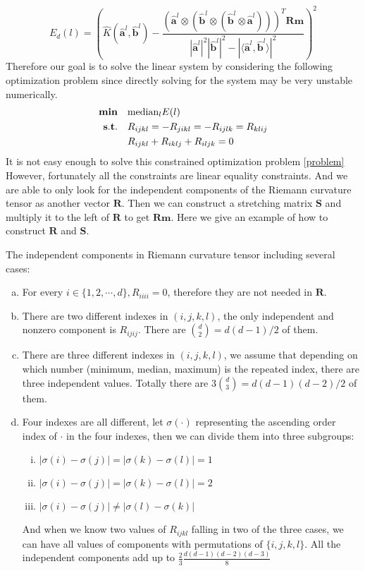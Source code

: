 \documentclass{article}
\begin{document}
\begin{equation}
	E_d(l)= \left(\widehat{K}(\widehat{\boldsymbol{a}}^l,\widehat{\boldsymbol{b}}^l)-\frac{(\widehat{\boldsymbol{a}}^l\otimes(\widehat{\boldsymbol{b}}^l\otimes(\widehat{\boldsymbol{b}}^l\otimes\widehat{\boldsymbol{a}}^l)))^T\boldsymbol{Rm}}{|\widehat{\boldsymbol{a}}^l|^2|\widehat{\boldsymbol{b}}^l|^2-|\langle \widehat{\boldsymbol{a}}^l,\widehat{\boldsymbol{b}}^l\rangle|^2}\right)^2
	\label{loss}
\end{equation}
Therefore our goal is to solve the linear system by considering the following optimization problem since directly solving for the system may be very unstable numerically.
\begin{align}
\notag
\textbf{min}\quad &\text{median}_{l} E(l) \\
\notag
\mathbf{s.t.}\quad &R_{ijkl}=-R_{jikl}=-R_{ijlk}=R_{klij} \\
& R_{ijkl}+R_{iklj}+R_{iljk} = 0
\label{problem}
\end{align}
It is not easy enough to solve this constrained optimization problem \ref{problem}
However, fortunately all the constraints are linear equality constraints. And we are able to only look for the independent components of the Riemann curvature tensor as another vector $\boldsymbol{R}$. Then we can construct a stretching matrix $\boldsymbol{S}$ and multiply it to the left of $\boldsymbol{R}$ to get $\boldsymbol{Rm}$. Here we give an example of how to construct $\boldsymbol{R}$ and $\boldsymbol{S}$.
\par
The independent components in Riemann curvature tensor including several cases:
\begin{enumerate}[(a)]
	\item For every $i \in \{1,2,\cdots,d\}, R_{iiii}=0$, therefore they are not needed in $\boldsymbol{R}$.
	\item There are two different indexes in $(i,j,k,l)$, the only independent and nonzero component is $R_{ijij}$. There are $\binom{d}{2}=d(d-1)/2$ of them. 
	\item There are three different indexes in $(i,j,k,l)$, we assume that depending on which number (minimum, median, maximum) is the repeated index, there are three independent values. Totally there are $3\binom{d}{3}=d(d-1)(d-2)/2$ of them.
	\item Four indexes are all different, let $\sigma(\cdot)$ representing the ascending order index of $\cdot$ in the four indexes, then we can divide them into three subgroups: 
	\begin{enumerate}[i)]
		\item $|\sigma(i)-\sigma(j)|=|\sigma(k)-\sigma(l)|=1$
		\item $|\sigma(i)-\sigma(j)|=|\sigma(k)-\sigma(l)|=2$
		\item $|\sigma(i)-\sigma(j)|\neq|\sigma(l)-\sigma(k)|$
	\end{enumerate}
	And when we know two values of $R_{ijkl}$ falling in two of the three cases, we can have all values of components with permutations of $\{i,j,k,l\}$. All the independent components add up to $\frac{2}{3}\frac{d(d-1)(d-2)(d-3)}{8}$
\end{enumerate}
\end{document}
